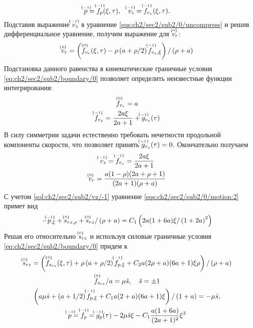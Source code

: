 \begin{equation*}
  \uindex{p}{-1} = \uindex{f}{-1}_{p}(\xi, \tau), \quad \uindex{v}{-1}_{z} = \uindex{f}{-1}_{v_{z}}(\xi, \tau).
\end{equation*}
Подставив выражение $\uindex{v}{-1}_{z}$ в уравнение \cref{eqs:ch2/sec2/sub2/0/uncompress} и решив дифференциальное уравнение, получим выражение для $\uindex{v}{0}_{r}$:
\begin{equation*}
  \uindex{v}{0}_{r} = \left(\uindex{f}{0}_{v_{r}}(\xi, \tau) -\rho \left(a+\rho/2\right) \uindex{f}{-1}_{v_{z},\xi}\right) / \left(\rho+a\right)
\end{equation*}
Подстановка данного равенства в кинематические граничные условия \cref{eq:ch2/sec2/sub2/boundary/0} позволяет определить неизвестные функции интегрирования:
\begin{gather*}
  \uindex{f}{0}_{v_{r}} = a\\
  \uindex{f}{-1}_{v_{z}} = \frac{2a\xi}{2a+1} + \uindex{g}{-1}_{v_{z}}(\tau)
\end{gather*}
В силу симметрии задачи естественно требовать нечетности продольной компоненты скорости, что позволяет принять $\uindex{g}{-1}_{v_{z}}(\tau) = 0$. Окончательно получаем
\begin{gather}
  \label{sol:ch2/sec2/sub2/vz/-1}
  \uindex{v}{-1}_{z} = \uindex{f}{-1}_{v_{z}} = \frac{2a\xi}{2a+1}
  \\
  \label{sol:ch2/sec2/sub2/vr/0}
  \uindex{v}{0}_{r} =  \frac{a(1-\rho)(2a+\rho+1)}{(2a+1)(\rho+a)}
\end{gather}
С учетом \cref{sol:ch2/sec2/sub2/vz/-1} уравнение \cref{eqs:ch2/sec2/sub2/0/motion:2} примет вид
\begin{equation*}
  -\uindex{p}{-1}_{,\xi} + \uindex{s}{0}_{rz,\rho} + \uindex{s}{0}_{rz} / \left(\rho+a\right) = C_1 \left(2a(1+6a)\xi/\left(1+2a\right)^2\right)
\end{equation*}
Решая его относительно $\uindex{s}{0}_{rz}$ и используя силовые граничные условия \cref{eq:ch2/sec2/sub2/boundary/0} придем к
\begin{gather*}
  \uindex{s}{0}_{rz} = \left(\uindex{f}{0}_{s_{rz}}(\xi, \tau) + \rho \left(a+\rho/2\right) \uindex{f}{-1}_{p,\xi} + C_2 a(2\rho+a)(6a+1)\xi\rho\right) / \left(\rho+a\right)
  \\
  \uindex{f}{0}_{s_{rz}} / a = \mu\hat{s}, \quad \hat{s} = \pm 1
  \\
  \left(a \mu\hat{s} + \left(a+1/2\right) \uindex{f}{-1}_{p,\xi} + C_1 a(2+a)(6a+1)\xi\right) / \left(1+a\right) = -\mu \hat{s},
  \\
  \uindex{p}{-1}=\uindex{f}{-1}_{p} =\uindex{g}{-1}_{p}(\tau) -2\mu\hat{s}\xi - C_1 \frac{a(1+6a)}{(2a+1)^2}\xi^2
\end{gather*}
